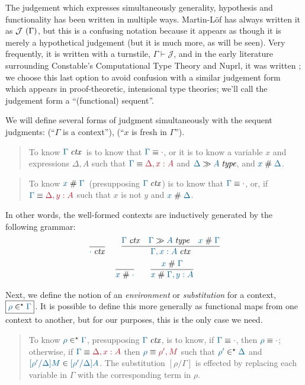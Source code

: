 The judgement which expresses simultaneously generality, hypothesis and
functionality has been written in multiple ways. Martin-L\"of has always
written it as $\mathcal{J}\ (\Gamma)$, but this is a confusing notation
because it appears as though it is merely a hypothetical judgement (but it is
much more, as will be seen). Very frequently, it is written with a turnstile,
$\Gamma\vdash\mathcal{J}$, and in the early literature surrounding Constable's
Computational Type Theory and Nuprl, it was written
; we choose this last option to avoid
confusion with a similar judgement form which appears in proof-theoretic,
intensional type theories; we'll call the judgement form a ``(functional) sequent''.


We will define several forms of judgment simultaneously with the sequent judgments:
\framebox{$\isctx{\Gamma}$} (``$\Gamma$ is a context''),
 (``$x$ is fresh in $\Gamma$'').

\begin{quote}
  To know $\isctx\Gamma$\ is to know that $\Match{\Gamma}{\cdot}$, or it is to know
  a variable $x$ and expressions $\Delta,A$ such that $\Match{\Gamma}{\Delta, x:A}$
  and $\sequent{\Delta}{\isset{A}}$, and $\fresh{x}{\Delta}$.
\end{quote}

\begin{quote}
  To know $\fresh{x}{\Gamma}$\ (presupposing $\isctx\Gamma$) is to know that
  $\Match{\Gamma}{\cdot}$, or, if $\Match{\Gamma}{\Delta,y:A}$
  such that $x$ is not $y$ and $\fresh{x}{\Delta}$.
\end{quote}

In other words, the well-formed contexts are inductively generated by the
following grammar:
\begin{gather*}
  \infer{\isctx\cdot}{}
  \qquad
  \infer{
    \isctx{\Gamma,x:A}
  }{
    \isctx\Gamma &
    \sequent{\Gamma}{\isset{A}} &
    \fresh{x}{\Gamma}
  }\\
  \infer{\fresh{x}{\cdot}}{}
  \qquad
  \infer{
    \fresh{x}{\Gamma,y:A}
  }{
    \fresh{x}{\Gamma}
  }
\end{gather*}

Next, we define the notion of an \emph{environment} or \emph{substitution} for
a context, $\framebox{\isenv{\rho}{\Gamma}}$. It is possible to define this
more generally as functional maps from one context to another, but for our
purposes, this is the only case we need.
\begin{quote}
  To know $\isenv{\rho}{\Gamma}$, presupposing $\isctx{\Gamma}$, is to know, if
  $\Match{\Gamma}{\cdot}$, then $\Match{\rho}{\cdot}$; otherwise, if
  $\Match{\Gamma}{\Delta, x:A}$ then $\Match{\rho}{\rho', M}$ such that
  $\isenv{\rho'}{\Delta}$ and $\ver{[\rho'/\Delta]M}{[\rho'/\Delta]A}$. The substitution
  $[\rho/\Gamma]$ is effected by replacing each variable in $\Gamma$ with the
  corresponding term in $\rho$.
\end{quote}

